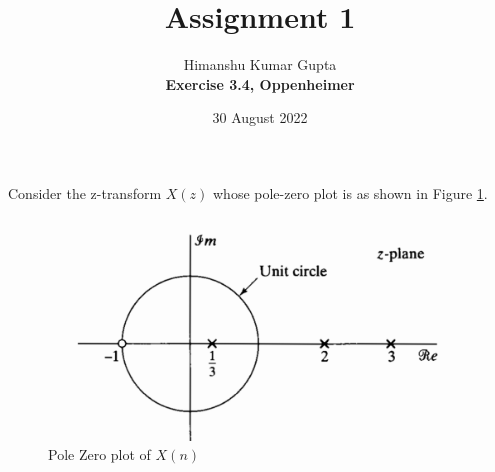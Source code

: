 \documentclass[journal,12pt,two column]{IEEEtran}
\title{Assignment 1}
\author{Himanshu Kumar Gupta\\
\textbf{Exercise 3.4, Oppenheimer}}
\date{30 August 2022}
\begin{document}
\maketitle



Consider the z-transform $X(z)$ whose pole-zero plot is as shown in Figure \ref{fig:pole_zero_plt}.
\begin{figure}[!ht]
	\centering
	\includegraphics[width=\columnwidth]{./pole_zero_plt}
	\caption{Pole Zero plot of $X(n)$}
	\label{fig:pole_zero_plt}
	\end{figure}
\end{document}
